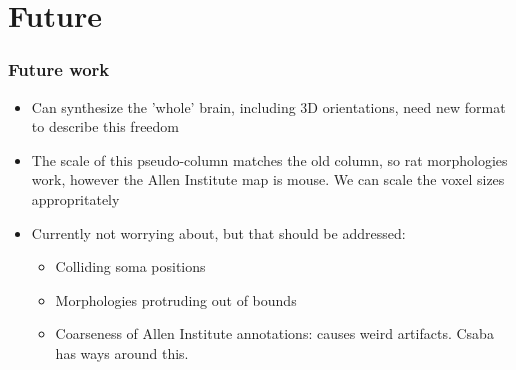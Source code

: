\documentclass{beamer}
\begin{document}
\section{Future}
\begin{frame}
  \frametitle{Future work}

  \begin{itemize}
     \item Can synthesize the 'whole' brain, including 3D orientations, need new format to describe this freedom
     \item The scale of this pseudo-column matches the old column, so rat morphologies work, however the Allen Institute map is mouse.  We can scale the voxel sizes appropritately
     \item Currently not worrying about, but that should be addressed:
     \begin{itemize}
        \item Colliding soma positions
        \item Morphologies protruding out of bounds
        \item Coarseness of Allen Institute annotations: causes weird artifacts.  Csaba has ways around this.
     \end{itemize}
  \end{itemize}
\end{frame}
\end{document}
